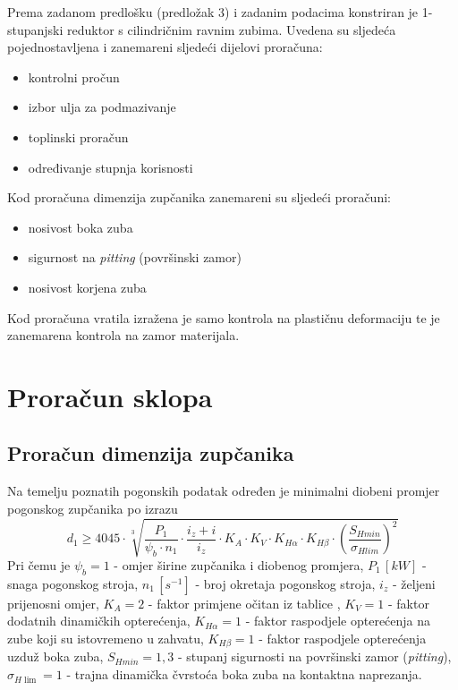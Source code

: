 \documentclass[11pt,a4paper,openright,twoside]{report}
\begin{document}
Prema zadanom predlošku (predložak 3) i zadanim podacima konstriran je 1-stupanjski reduktor s cilindričnim ravnim zubima.
Uvedena su sljedeća pojednostavljena i zanemareni sljedeći dijelovi proračuna:
\begin{itemize}
\item kontrolni pročun
\item izbor ulja za podmazivanje
\item toplinski proračun
\item određivanje stupnja korisnosti
\end{itemize}
Kod proračuna dimenzija zupčanika zanemareni su sljedeći proračuni:
\begin{itemize}
\item nosivost boka zuba
\item sigurnost na \textit{pitting} (površinski zamor)
\item nosivost korjena zuba
\end{itemize}
Kod proračuna vratila izražena je samo kontrola na plastičnu deformaciju te je zanemarena kontrola na zamor materijala.

\chapter{Proračun sklopa}
\section{Proračun dimenzija zupčanika}
Na temelju poznatih pogonskih podatak određen je minimalni diobeni promjer pogonskog zupčanika po izrazu
\begin{equation}
d_1\geq 4045 \cdot \sqrt[3]{\frac{P_1}{\psi_b \cdot n_1} \cdot \frac{i_z +i}{i_z}\cdot K_A \cdot 
K_V \cdot K_{H\alpha} \cdot K_{H\beta} \cdot \left(\frac{S_{Hmin}}{\sigma_{Hlim}}\right)^2 }\label{equ:d1minimalno}
\end{equation}
Pri čemu je $\psi_b=1$ - omjer širine zupčanika i diobenog promjera,
$P_1 \, [kW]$ - snaga pogonskog stroja,
$n_1 \, [s^{-1}]$ - broj okretaja pogonskog stroja,
$i_z$ - željeni prijenosni omjer,
$K_A=2$ - faktor primjene očitan iz tablice \cite{potrebniMaterijali},
$K_V=1$ - faktor dodatnih dinamičkih opterećenja,
$K_{H\alpha}=1$ - faktor raspodjele opterećenja na zube koji su istovremeno u zahvatu,
$K_{H\beta}=1$ - faktor raspodjele opterećenja uzduž boka zuba,
$S_{Hmin}=1,3$ - stupanj sigurnosti na površinski zamor (\textit{pitting}),
$\sigma_{H\lim}=1$ - trajna dinamička čvrstoća boka zuba na kontaktna naprezanja.
\end{document}
